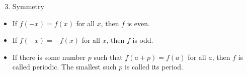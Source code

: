 \begin{frame}[t]
\begin{enumerate}
\setcounter{enumi}{2}
\item  Symmetry
\end{enumerate}
\begin{itemize}
\item<1-| alert@2>  \alert<handout:1| 0>{If $f(-x) = f(x)$ for all $x$, then $f$ is even.}
\item<1-| alert@3>  \alert<handout:2| 0>{If $f(-x) = -f(x)$ for all $x$, then $f$ is odd.}
\item<1-| alert@4>  \alert<handout:3| 0>{If there is some number $p$ such that $f(a+p) = f(a)$ for all $a$, then $f$ is called periodic.  The smallest such $p$ is called its period.}
\end{itemize}
\begin{center}
\ %
%
\end{center}
\end{frame}


